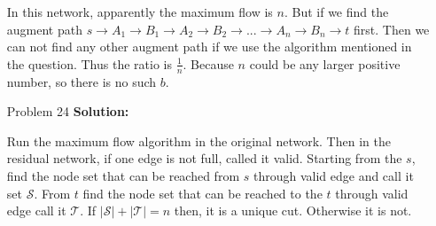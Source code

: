 \normalfont\documentclass[letterpaper,11pt]{article}
\begin{document}
\begin{enumerate}
	In this network, apparently the maximum flow is $n$. But if we find the augment path $s\to A_1 \to B_1 \to A_2 \to B_2 \to ... \to A_n \to B_n \to t$ first. Then we can not find any other augment path if we use the algorithm mentioned in the question. Thus the ratio is $\frac{1}{n}$. Because $n$ could be any larger positive number, so there is no such $b$.
\item [Problem 24]\textbf{Solution:}\par
	Run the maximum flow algorithm in the original network. Then in the residual network, if one edge is not full, called it valid. Starting from the $s$, find the node set that can be reached from $s$ through valid edge and call it set $\mathcal{S}$. From $t$ find the node set that can be reached to the $t$ through valid edge call it $\mathcal{T}$. If $|\mathcal{S}| + |\mathcal{T}| = n$ then, it is a unique cut. Otherwise it is not.
\end{enumerate}
\end{document}
